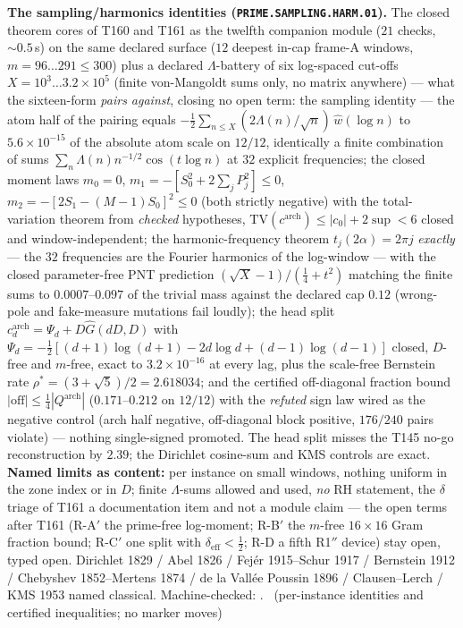 \par\smallskip\noindent\textbf{The sampling/harmonics identities
(\texttt{PRIME.SAMPLING.HARM.01}).}
The closed theorem cores of T160 and T161 as the twelfth companion module
($21$ checks, ${\sim}0.5$\,s) on the same declared surface ($12$ deepest
in-cap frame-A
windows, $m=96\ldots291\le300$) plus a declared $\Lambda$-battery of six
log-spaced cut-offs $X=10^{3}\ldots3.2\times10^{5}$ (finite von-Mangoldt
sums only, no matrix anywhere) --- what the sixteen-form \emph{pairs
against}, closing no open term: the sampling identity --- the atom half
of the pairing equals $-\tfrac12\sum_{n\le X}(2\Lambda(n)/\sqrt n)\,
\widehat w(\log n)$ to $5.6\times10^{-15}$ of the absolute atom scale on
$12/12$, identically a finite combination of sums
$\sum_n\Lambda(n)n^{-1/2}\cos(t\log n)$ at $32$ explicit frequencies;
the closed moment laws $m_0=0$, $m_1=-[S_0^2+2\sum_jP_j^2]\le0$,
$m_2=-[2S_1-(M{-}1)S_0]^2\le0$ (both strictly negative) with the
total-variation theorem from \emph{checked} hypotheses,
$\mathrm{TV}(c^{\mathrm{arch}})\le|c_0|+2\sup<6$ closed and
window-independent; the harmonic-frequency theorem $t_j(2\alpha)=2\pi j$
\emph{exactly} --- the $32$ frequencies are the Fourier harmonics of the
log-window --- with the closed parameter-free PNT prediction
$(\sqrt X-1)/(\tfrac14+t^2)$ matching the finite sums to
$0.0007$--$0.097$ of the trivial mass against the declared cap $0.12$
(wrong-pole and fake-measure mutations fail loudly); the head split
$c^{\mathrm{arch}}_d=\Psi_d+D\widehat G(dD,D)$ with
$\Psi_d=-\tfrac12[(d{+}1)\log(d{+}1)-2d\log d+(d{-}1)\log(d{-}1)]$
closed, $D$-free and $m$-free, exact to $3.2\times10^{-16}$ at every
lag, plus the scale-free Bernstein rate $\rho^*=(3+\sqrt5)/2=2.618034$;
and the certified off-diagonal fraction bound
$|\text{off}|\le\tfrac14|Q^{\mathrm{arch}}|$ ($0.171$--$0.212$ on
$12/12$) with the \emph{refuted} sign law wired as the negative control
(arch half negative, off-diagonal block positive, $176/240$ pairs
violate) --- nothing single-signed promoted. The head split misses the
T145 no-go reconstruction by $2.39$; the Dirichlet cosine-sum and KMS
controls are exact.
\textbf{Named limits as content:} per instance on small windows, nothing
uniform in the zone index or in $D$; finite $\Lambda$-sums allowed and
used, \emph{no} RH statement, the $\delta$ triage of T161 a
documentation item and not a module claim --- the open terms after T161
(R-A$'$ the prime-free log-moment; R-B$'$ the $m$-free $16\times16$ Gram
fraction bound; R-C$'$ one split with $\delta_{\mathrm{eff}}<\tfrac12$;
R-D a fifth R1$''$ device) stay open, typed open.
Dirichlet 1829 / Abel 1826 / Fej\'er 1915--Schur 1917 / Bernstein 1912 /
Chebyshev 1852--Mertens 1874 / de la Vall\'ee Poussin 1896 /
Clausen--Lerch / KMS 1953 named classical. Machine-checked:
.
\mE\ (per-instance identities and certified inequalities; no marker moves)
\par\smallskip


